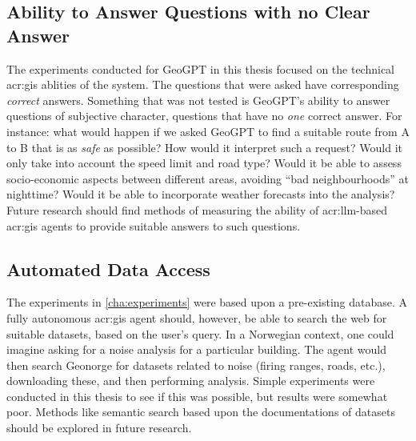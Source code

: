 \subsection{Ability to Answer Questions with no Clear Answer}

The experiments conducted for GeoGPT in this thesis focused on the technical \acrshort{acr:gis} ablities of the system. The questions that were asked have corresponding \textit{correct} answers. Something that was not tested is GeoGPT's ability to answer questions of subjective character, questions that have no \textit{one} correct answer. For instance: what would happen if we asked GeoGPT to find a suitable route from A to B that is as \textit{safe} as possible? How would it interpret such a request? Would it only take into account the speed limit and road type? Would it be able to assess socio-economic aspects between different areas, avoiding \enquote{bad neighbourhoods} at nighttime? Would it be able to incorporate weather forecasts into the analysis? Future research should find methods of measuring the ability of \acrshort{acr:llm}-based \acrshort{acr:gis} agents to provide suitable answers to such questions.

\subsection{Automated Data Access}

The experiments in \autoref{cha:experiments} were based upon a pre-existing database. A fully autonomous \acrshort{acr:gis} agent should, however, be able to search the web for suitable datasets, based on the user's query. In a Norwegian context, one could imagine asking for a noise analysis for a particular building. The agent would then search Geonorge for datasets related to noise (firing ranges, roads, etc.), downloading these, and then performing analysis. Simple experiments were conducted in this thesis to see if this was possible, but results were somewhat poor. Methods like semantic search based upon the documentations of datasets should be explored in future research.
